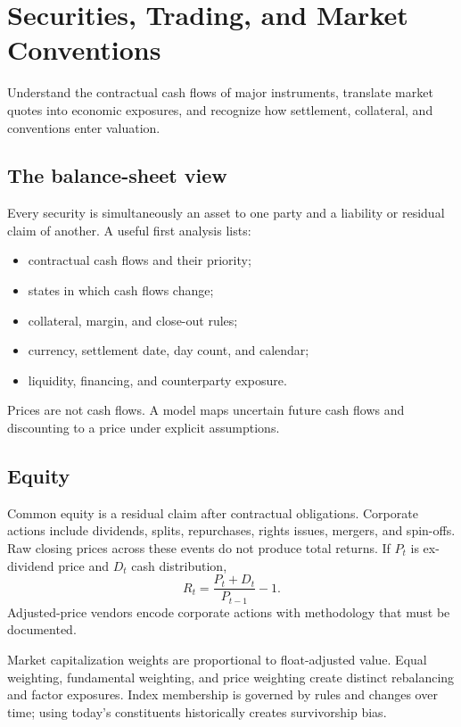\chapter{Securities, Trading, and Market Conventions}

\begin{objectives}
Understand the contractual cash flows of major instruments, translate market quotes
into economic exposures, and recognize how settlement, collateral, and conventions
enter valuation.
\end{objectives}

\section{The balance-sheet view}

Every security is simultaneously an asset to one party and a liability or residual
claim of another. A useful first analysis lists:

\begin{itemize}
\item contractual cash flows and their priority;
\item states in which cash flows change;
\item collateral, margin, and close-out rules;
\item currency, settlement date, day count, and calendar;
\item liquidity, financing, and counterparty exposure.
\end{itemize}

Prices are not cash flows. A model maps uncertain future cash flows and discounting
to a price under explicit assumptions.

\section{Equity}

Common equity is a residual claim after contractual obligations. Corporate actions
include dividends, splits, repurchases, rights issues, mergers, and spin-offs.
Raw closing prices across these events do not produce total returns. If $P_t$ is
ex-dividend price and $D_t$ cash distribution,
\[
R_t=\frac{P_t+D_t}{P_{t-1}}-1.
\]
Adjusted-price vendors encode corporate actions with methodology that must be
documented.

Market capitalization weights are proportional to float-adjusted value. Equal
weighting, fundamental weighting, and price weighting create distinct rebalancing
and factor exposures. Index membership is governed by rules and changes over time;
using today's constituents historically creates survivorship bias.

